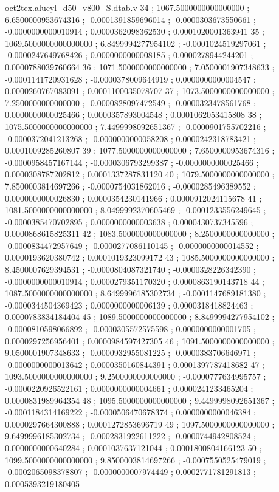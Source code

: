 \begin{filecontents}[overwrite]{oct2tex.alucyl_d50_v800_S.dtab.v}
34 ; 1067.5000000000000000 ; 6.6500000953674316 ; -0.0001391859696014 ; -0.0000303673550661 ; -0.0000000000010914 ; 0.0000362098362530 ; 0.0001020001363941
35 ; 1069.5000000000000000 ; 6.8499994277954102 ; -0.0001024519297061 ; -0.0000247649768426 ; 0.0000000000008185 ; 0.0000278944244201 ; 0.0000788039760664
36 ; 1071.5000000000000000 ; 7.0500001907348633 ; -0.0001141720931628 ; -0.0000378009644919 ; 0.0000000000004547 ; 0.0000260767083091 ; 0.0001100035078707
37 ; 1073.5000000000000000 ; 7.2500000000000000 ; -0.0000828097472549 ; -0.0000323478561768 ; 0.0000000000025466 ; 0.0000357893004548 ; 0.0001062053415808
38 ; 1075.5000000000000000 ; 7.4499998092651367 ; -0.0000901755702216 ; -0.0000372041213268 ; -0.0000000000058208 ; 0.0000242318783421 ; 0.0001009285260807
39 ; 1077.5000000000000000 ; 7.6500000953674316 ; -0.0000958457167144 ; -0.0000306793299387 ; -0.0000000000025466 ; 0.0000308787202812 ; 0.0001337287831120
40 ; 1079.5000000000000000 ; 7.8500003814697266 ; -0.0000754031862016 ; -0.0000285496389552 ; 0.0000000000026830 ; 0.0000354230141966 ; 0.0000912024115678
41 ; 1081.5000000000000000 ; 8.0499992370605469 ; -0.0001233556249645 ; -0.0000385470702895 ; 0.0000000000003638 ; 0.0000430737345596 ; 0.0000868615825311
42 ; 1083.5000000000000000 ; 8.2500000000000000 ; -0.0000834472957649 ; -0.0000277086110145 ; -0.0000000000014552 ; 0.0000193620380742 ; 0.0001019323099172
43 ; 1085.5000000000000000 ; 8.4500007629394531 ; -0.0000804087321740 ; -0.0000328226342390 ; -0.0000000000010914 ; 0.0000279351170320 ; 0.0000863190143718
44 ; 1087.5000000000000000 ; 8.6499996185302734 ; -0.0001147689181380 ; -0.0000344504369423 ; 0.0000000000006139 ; 0.0000318418824463 ; 0.0000783834184404
45 ; 1089.5000000000000000 ; 8.8499994277954102 ; -0.0000810598066892 ; -0.0000305572575598 ; 0.0000000000001705 ; 0.0000297256956401 ; 0.0000984597427305
46 ; 1091.5000000000000000 ; 9.0500001907348633 ; -0.0000932955081225 ; -0.0000383706646971 ; -0.0000000000013642 ; 0.0000350160844391 ; 0.0001397787418682
47 ; 1093.5000000000000000 ; 9.2500000000000000 ; -0.0000777634995757 ; -0.0000220926522161 ; 0.0000000000004661 ; 0.0000241233465204 ; 0.0000831989964354
48 ; 1095.5000000000000000 ; 9.4499998092651367 ; -0.0001184314169222 ; -0.0000506470678374 ; 0.0000000000046384 ; 0.0000297664300888 ; 0.0001272853696719
49 ; 1097.5000000000000000 ; 9.6499996185302734 ; -0.0002831922611222 ; -0.0000744942808524 ; 0.0000000000640284 ; 0.0001037637121044 ; 0.0001800804166123
50 ; 1099.5000000000000000 ; 9.8500003814697266 ; -0.0007550525479019 ; -0.0002065098378807 ; -0.0000000007974449 ; 0.0002771781291813 ; 0.0005393219180405

\end{filecontents}
